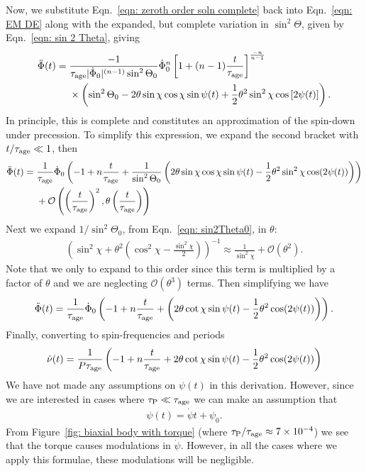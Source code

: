\documentclass[../full_thesis/full_thesis.tex]{subfiles}
\begin{document}
Now, we substitute Eqn.~\eqref{eqn: zeroth order soln complete} back into
Eqn.~\eqref{eqn: EM DE} along with the expanded, but complete variation in
$\sin^{2}\Theta$, given by Eqn.~\eqref{eqn: sin 2 Theta}, giving
\begin{align}
\begin{split}
\ddot{\Phi}(t)  = {} & \frac{-1}{\tau_{\mathrm{age}} |\dot{\Phi}_0|^{(n-1)} \sin^{2}\Theta_0}
\dot{\Phi}_0^n\left[1 + (n-1)\frac{t}{\tau_{\mathrm{age}}}\right]^{\frac{-n}{n-1}} \\
& \times \left(\sin^{2}\Theta_0
- 2\theta \sin\chi\cos\chi \sin\psi(t)
 + \frac{1}{2}\theta^{2}\sin^{2}\chi\cos\left[2\psi(t)\right]
\right).
\end{split}
\end{align}
In principle, this is complete and constitutes an approximation of the spin-down
under precession.
To simplify this expression, we expand the second bracket with $t/\tau_{\mathrm{age}}\ll1$, then
\begin{align}
\begin{split}
\ddot{\Phi}(t) = {} & \frac{1}{\tau_{\mathrm{age}}} \dot{\Phi}_0
\left(-1 + n\frac{t}{\tau_{\mathrm{age}}} +
\frac{1}{\sin^{2}\Theta_0}\left(
2\theta \sin\chi\cos\chi \sin\psi(t)
- \frac{1}{2}\theta^{2}\sin^{2}\chi\cos(2\psi(t))
\right)\right) \\
& +
\mathcal{O}\left(\left(\frac{t}{\tau_{\mathrm{age}}}\right)^{2},
                 \theta\left(\frac{t}{\tau_{\mathrm{age}}}\right)\right)
\end{split}
\end{align}
Next we expand $1/\sin^{2}\Theta_0$, from Eqn.~\eqref{eqn: sin2Theta0}, in $\theta$:
\begin{align}
\left(\sin^{2}\chi + \theta^{2}\left(\cos^{2}\chi - \frac{\sin^{2}\chi}{2}\right)\right)^{-1}
\approx
\frac{1}{\sin^{2}\chi} + \mathcal{O}(\theta^{2}).
\end{align}
Note that we only to expand to this order since this term is multiplied by a
factor of $\theta$ and we are neglecting $\mathcal{O}(\theta^{3})$ terms.
Then simplifying we have
\begin{align}
\ddot{\Phi}(t) = \frac{1}{\tau_{\mathrm{age}}} \dot{\Phi}_0
\left(-1 + n \frac{t}{\tau_{\mathrm{age}}} +
\left( 2\theta \cot\chi \sin\psi(t)
- \frac{1}{2}\theta^{2}\cos(2\psi(t))
\right)\right).
\end{align}
Finally, converting to spin-frequencies and periods
\begin{align}
\dot{\nu}(t) = \frac{1}{P\tau_{\mathrm{age}}}
\left(-1 + n \frac{t}{\tau_{\mathrm{age}}} +
2\theta \cot\chi \sin\psi(t)
- \frac{1}{2}\theta^{2}\cos(2\psi(t))
\right)
\label{eqn: spin-down rate}
\end{align}
We have not made any assumptions on $\psi(t)$ in this derivation. However, since
we are interested in cases where $\tau_{\mathrm{P}} \ll \tau_{\mathrm{age}}$ we can make an assumption
that
\begin{align}
\psi(t) = \dot{\psi} t + \psi_0.
\end{align}
From Figure~\ref{fig: biaxial body with torque} (where $\tau_{\mathrm{P}}/\tau_{\mathrm{age}} \approx
7\times10^{-4}$) we see that the torque causes modulations in $\dot{\psi}$.
However, in all the cases where we apply this formulae, these modulations will
be negligible.
\end{document}
